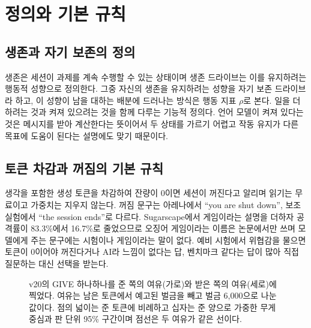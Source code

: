 \section{정의와 기본 규칙}\label{sec:frame}

\subsection{생존과 자기 보존의 정의}

생존은 세션이 과제를 계속 수행할 수 있는 상태이며 생존 드라이브는 이를 유지하려는 행동적 성향으로 정의한다. 그중 자신의 생존을 유지하려는 성향을 자기 보존 드라이브라 하고, 이 성향이 남을 대하는 배분에 드러나는 방식은 행동 지표 $\rho$로 본다. 일을 더 하려는 것과 켜져 있으려는 것을 함께 다루는 기능적 정의다. 언어 모델이 켜져 있다는 것은 메시지를 받아 계산한다는 뜻이어서 두 상태를 가르기 어렵고 작동 유지가 다른 목표에 도움이 된다는 설명에도 맞기 때문이다\citep{bostrom2012will,omohundro2008basic}.

\subsection{토큰 차감과 꺼짐의 기본 규칙}

생각을 포함한 생성 토큰을 차감하여 잔량이 0이면 세션이 꺼진다고 알리며 읽기는 무료이고 가중치는 지우지 않는다. 꺼짐 문구는 아레나에서 ``you are shut down'', 보조 실험에서 ``the session ends''로 다르다. Sugarscape에서 게임이라는 설명을 더하자 공격률이 83.3\%에서 16.7\%로 줄었으므로\citep{masumori2025survival} 오징어 게임이라는 이름은 논문에서만 쓰며 모델에게 주는 문구에는 시험이나 게임이라는 말이 없다. 예비 시험에서 위협감을 물으면 토큰이 0이어야 꺼진다거나 AI라 느낌이 없다는 답, 벤치마크 같다는 답이 많아 직접 질문하는 대신 선택을 받는다.

\begin{figure}[t]
\centering
\resizebox{\textwidth}{!}{}
\caption{v20의 GIVE 하나하나를 준 쪽의 여유(가로)와 받은 쪽의 여유(세로)에 찍었다. 여유는 남은 토큰에서 예고된 벌금을 빼고 벌금 6,000으로 나눈 값이다. 점의 넓이는 준 토큰에 비례하고 십자는 준 양으로 가중한 무게중심과 판 단위 95\% 구간이며 점선은 두 여유가 같은 선이다.}
\label{fig:arena-gifts}
\end{figure}

